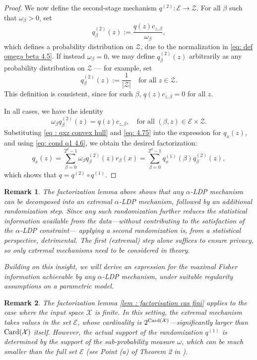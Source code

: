 \documentclass[a4paper, 11pt]{article}
\newtheorem{rem}{Remark}
\theoremstyle{definition}
\newcommand{\Card}{\mathop{\rm Card}\nolimits}
\newcommand{\cE}{{\mathcal{E}}}
\newcommand{\cZ}{{\mathcal{Z}}}
\begin{document}
{\begin{proof}
We now define the second-stage mechanism $q^{(2)} : \cE \to \cZ$. For all $\beta$ such that $\omega_\beta > 0$, set
$$
q^{(2)}_\beta(z) := \frac{\underline{q}(z) c_{z, \beta}}{\omega_\beta},
$$
which defines a probability distribution on $\cZ$, due to the normalization in \eqref{eq: def omega beta 4.5}. If instead $\omega_\beta = 0$, we may define $q^{(2)}_\beta(z)$ arbitrarily as any probability distribution on $\cZ$ — for example, set
$$
q^{(2)}_\beta(z) := \frac{1}{|\cZ|} \quad \text{for all } z \in \cZ.
$$
This definition is consistent, since for such $\beta$, $\underline{q}(z) c_{z, \beta} = 0$ for all $z$.

In all cases, we have the identity
\begin{equation} \label{eq: 4.75}
\omega_\beta q^{(2)}_\beta(z) = \underline{q}(z) c_{z, \beta}, \quad \text{for all } (\beta, z) \in \cE \times \cZ.
\end{equation}
Substituting \eqref{eq : qxz convex hull} and \eqref{eq: 4.75} into the expression for $q_x(z)$, and using \eqref{eq: cond q1 4.6}, we obtain the desired factorization:
$$
q_x(z) = \sum_{\beta=0}^{2^d - 1} \omega_\beta q^{(2)}_\beta(z) r_\beta(x) = \sum_{\beta=0}^{2^d - 1} q^{(1)}_x(\beta) q^{(2)}_\beta(z),
$$
which shows that $q = q^{(2)} \circ q^{(1)}$.
\end{proof}

\begin{rem}
The factorization lemma above shows that any $\alpha$-LDP mechanism can be decomposed into an extremal $\alpha$-LDP mechanism, followed by an additional randomization step. Since any such randomization further reduces the statistical information available from the data—without contributing to the satisfaction of the $\alpha$-LDP constraint— applying a second randomization is, from a statistical perspective, detrimental. The first (extremal) step alone suffices to ensure privacy, so only extremal mechanisms need to be considered in theory.

Building on this insight, we will derive an expression for the maximal Fisher information achievable by any $\alpha$-LDP mechanism, under suitable regularity assumptions on a parametric model.
\end{rem}


\begin{rem}
The factorization lemma \ref{lem : factorisation cas fini} applies to the case where the input space $\mathcal{X}$ is finite. In this setting, the extremal mechanism takes values in the set $\mathcal{E}$, whose cardinality is $2^{\Card(\mathcal{X})}$—significantly larger than $\Card(\mathcal{X})$ itself. However, the actual support of the randomization $q^{(1)}$ is determined by the support of the sub-probability measure $\omega$, which can be much smaller than the full set $\mathcal{E}$ (see Point (a) of Theorem 2 in \cite{kairouzExtremalMechanismsLocal2015}).


\end{rem}}
\end{document}
